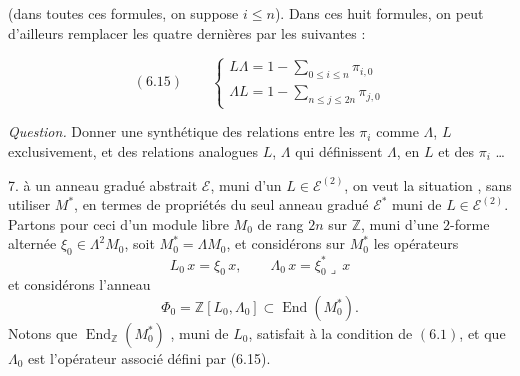 \documentclass[11pt,a4paper]{article}
\begin{document}
(dans toutes ces formules, on suppose $i \leqslant n$). Dans ces huit formules,
on peut d'ailleurs remplacer les quatre dernières par les suivantes
 :



\[ (6.15) \qquad \begin{cases} L \Lambda = 1 - \sum_{0 \leqslant i \leqslant n} \pi_{i,0} \\[2pt] \Lambda L = 1 - \sum_{n \leqslant j \leqslant 2n} \pi_{j,0} \end{cases} \]



\emph{Question.} Donner une \ill{} synthétique des relations entre les
$\pi_{i}$ comme \struck{\ill{}} $\Lambda$, $L$ exclusivement, et \ill{} des
relations analogues \ill{} $L$, $\Lambda$ \ill{} qui définissent $\Lambda$,
 en $L$ et des $\pi_{i}$ \ldots

7.  à un anneau gradué abstrait $\mathcal{E}$, muni d'un
$L \in \mathcal{E}^{(2)}$, on veut  la situation
, sans utiliser $M^{*}$, en termes de propriétés du
seul anneau gradué $\mathcal{E}^{*}$ muni de $L \in \mathcal{E}^{(2)}$.
Partons pour ceci \struck{\ill{}} d'un module libre $M_{0}$ de rang $2n$ sur
$\mathbb{Z}$, muni d'une $2$-forme alternée 
 $\xi_{0} \in \Lambda^{2} M_{0}$,  soit $M^{*}_{0} = \Lambda M_{0}$,
et considérons sur $M^{*}_{0}$ les opérateurs
\[ L_{0}\, x = \xi_{0}\, x , \qquad \Lambda_{0}\, x = \xi^{*}_{0} \lrcorner\, x \]
et considérons l'anneau 
\[ \Phi_{0} = \mathbb{Z}[L_{0}, \Lambda_{0}] \subset \operatorname{End}(M^{*}_{0}) . \]
Notons que $\operatorname{End}_{\mathbb{Z}}(M^{*}_{0})$ , muni de $L_{0}$, satisfait à la condition
de $(6.1)$\uncertain{$(\omega)$}, \struck{\ill{}} et que $\Lambda_{0}$ est
l'opérateur associé défini par (6.15).

\end{document}
